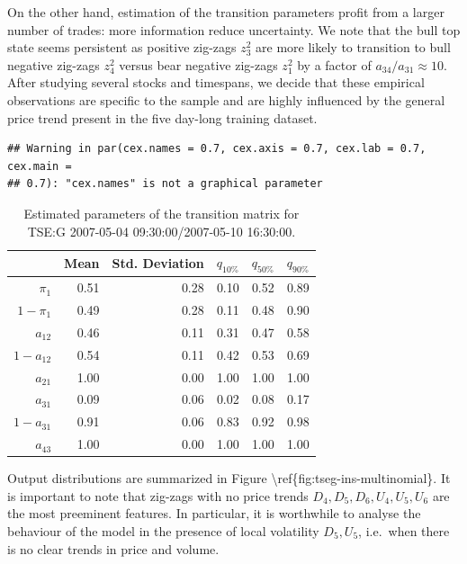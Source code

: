 \documentclass[]{article}
\begin{document}
On the other hand, estimation of the transition parameters profit from a
larger number of trades: more information reduce uncertainty. We note
that the bull top state seems persistent as positive zig-zags \(z^2_3\)
are more likely to transition to bull negative zig-zags \(z^2_4\) versus
bear negative zig-zags \(z^2_1\) by a factor of
\(a_{34} / a_{31} \approx 10\). After studying several stocks and
timespans, we decide that these empirical observations are specific to
the sample and are highly influenced by the general price trend present
in the five day-long training dataset.

\begin{verbatim}
## Warning in par(cex.names = 0.7, cex.axis = 0.7, cex.lab = 0.7, cex.main =
## 0.7): "cex.names" is not a graphical parameter
\end{verbatim}

\begin{table}[ht]
\centering
\begingroup\footnotesize
\begin{tabularx}{0.65 \textwidth}{rRRRRR}
  \toprule
 & Mean & Std. Deviation & $q_{10\%}$ & $q_{50\%}$ & $q_{90\%}$ \\ 
  \midrule
$\pi_{1}$ & 0.51 & 0.28 & 0.10 & 0.52 & 0.89 \\ 
  $1 - \pi_{1}$ & 0.49 & 0.28 & 0.11 & 0.48 & 0.90 \\ 
  $a_{12}$ & 0.46 & 0.11 & 0.31 & 0.47 & 0.58 \\ 
  $1 - a_{12}$ & 0.54 & 0.11 & 0.42 & 0.53 & 0.69 \\ 
  $a_{21}$ & 1.00 & 0.00 & 1.00 & 1.00 & 1.00 \\ 
  $a_{31}$ & 0.09 & 0.06 & 0.02 & 0.08 & 0.17 \\ 
  $1 - a_{31}$ & 0.91 & 0.06 & 0.83 & 0.92 & 0.98 \\ 
  $a_{43}$ & 1.00 & 0.00 & 1.00 & 1.00 & 1.00 \\ 
   \bottomrule
\end{tabularx}
\endgroup
\caption{Estimated parameters of the transition matrix 
               for TSE:G 2007-05-04 09:30:00/2007-05-10 16:30:00.} 
\label{tab:tseg-ins-transition}
\end{table}

Output distributions are summarized in Figure
\textbackslash{}ref\{fig:tseg-ins-multinomial\}. It is important to note
that zig-zags with no price trends \(D_4, D_5, D_6, U_4, U_5, U_6\) are
the most preeminent features. In particular, it is worthwhile to analyse
the behaviour of the model in the presence of local volatility
\(D_5, U_5\), i.e.~when there is no clear trends in price and volume.
\end{document}
